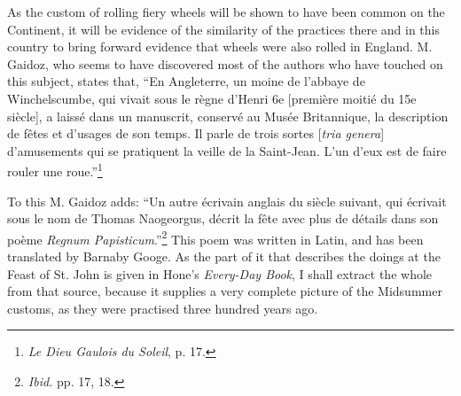 \documentclass[a4paper, 11pt, oneside, polutonikogreek, english]{article}
\begin{document}
As the custom of rolling fiery wheels will be shown to have been common on the Continent, it will be evidence of the similarity of the practices there and in this country to bring forward evidence that wheels were also rolled in England. M. Gaidoz, who seems to have discovered most of the authors who have touched on this subject, states that, ``En Angleterre, un moine de l'abbaye de Winchelscumbe, qui vivait sous le règne d'Henri 6e [première moitié du 15e siècle], a laissé dans un manuscrit, conservé au Musée Britannique, la description de fêtes et d'usages de son temps. Il parle de trois sortes [\emph{tria genera}] d'amusements qui se pratiquent la veille de la Saint-Jean. L'un d'eux est de faire rouler une roue.''\footnote{\emph{Le Dieu Gaulois du Soleil}, p. 17.}

To this M. Gaidoz adds: ``Un autre écrivain anglais du siècle suivant, qui écrivait sous le nom de Thomas Naogeorgus, décrit la fête avec plus de détails dans son poème \emph{Regnum Papisticum}.''\footnote{\emph{Ibid.} pp. 17, 18.} This poem was written in Latin, and has been translated by Barnaby Googe. As the part of it that describes the doings at the Feast of St. John is given in Hone's \emph{Every-Day Book}, I shall extract the whole from that source, because it supplies a very complete picture of the Midsummer customs, as they were practised three hundred years ago.
\end{document}
